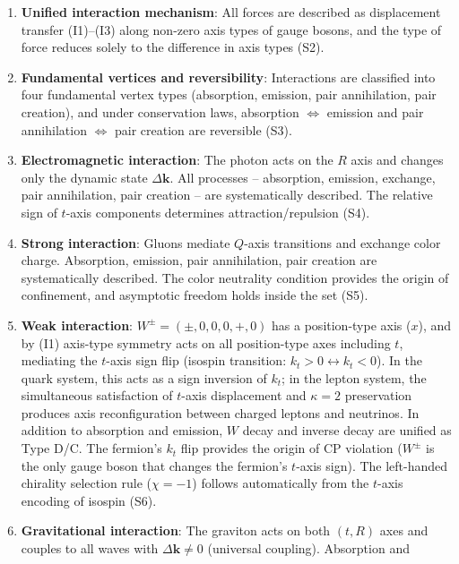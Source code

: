 \documentclass[
  a4paper,11pt]{article}
\theoremstyle{definition}
\theoremstyle{remark}
\begin{document}
\begin{enumerate}
\def\labelenumi{\arabic{enumi}.}
\item
  \textbf{Unified interaction mechanism}: All forces are described as
  displacement transfer (I1)--(I3) along non-zero axis types of gauge
  bosons, and the type of force reduces solely to the difference in axis
  types (S2).
\item
  \textbf{Fundamental vertices and reversibility}: Interactions are
  classified into four fundamental vertex types (absorption, emission,
  pair annihilation, pair creation), and under conservation laws,
  absorption \(\Leftrightarrow\) emission and pair annihilation
  \(\Leftrightarrow\) pair creation are reversible (S3).
\item
  \textbf{Electromagnetic interaction}: The photon acts on the \(R\)
  axis and changes only the dynamic state \(\Delta\mathbf{k}\). All
  processes -- absorption, emission, exchange, pair annihilation, pair
  creation -- are systematically described. The relative sign of
  \(t\)-axis components determines attraction/repulsion (S4).
\item
  \textbf{Strong interaction}: Gluons mediate \(Q\)-axis transitions and
  exchange color charge. Absorption, emission, pair annihilation, pair
  creation are systematically described. The color neutrality condition
  provides the origin of confinement, and asymptotic freedom holds
  inside the set (S5).
\item
  \textbf{Weak interaction}: \(W^{\pm} = (\pm, 0, 0, 0, +, 0)\) has a
  position-type axis (\(x\)), and by (I1) axis-type symmetry acts on all
  position-type axes including \(t\), mediating the \(t\)-axis sign flip
  (isospin transition: \(k_t > 0 \leftrightarrow k_t < 0\)). In the
  quark system, this acts as a sign inversion of \(k_t\); in the lepton
  system, the simultaneous satisfaction of \(t\)-axis displacement and
  \(\kappa = 2\) preservation produces axis reconfiguration between
  charged leptons and neutrinos. In addition to absorption and emission,
  \(W\) decay and inverse decay are unified as Type D/C. The fermion's
  \(k_t\) flip provides the origin of CP violation (\(W^{\pm}\) is the
  only gauge boson that changes the fermion's \(t\)-axis sign). The
  left-handed chirality selection rule (\(\chi = -1\)) follows
  automatically from the \(t\)-axis encoding of isospin (S6).
\item
  \textbf{Gravitational interaction}: The graviton acts on both
  \((t, R)\) axes and couples to all waves with
  \(\Delta\mathbf{k} \neq 0\) (universal coupling). Absorption and

\end{enumerate}
\end{document}
